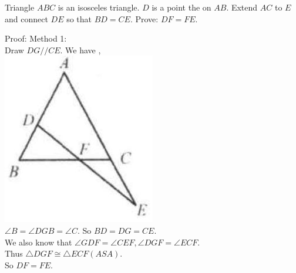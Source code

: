 \documentclass{article}
\begin{document}
Triangle \(A B C\) is an isosceles triangle. \(D\) is a point the on \(A B\). Extend \(A C\) to \(E\) and connect \(D E\) so that \(B D=C E\). Prove: \(D F=F E\).

Proof:
Method 1:\\
Draw \(D G / / C E\). We have ,\\
\centering
\includegraphics[width=\textwidth]{images/102.jpg}\\
\(\angle B=\angle D G B=\angle C\). So \(B D=D G=C E\).\\
We also know that \(\angle G D F=\angle C E F, \angle D G F=\angle E C F\).\\
Thus \(\triangle D G F \cong \triangle E C F(A S A)\).\\
So \(D F=F E\).\\
\centering
\end{document}
